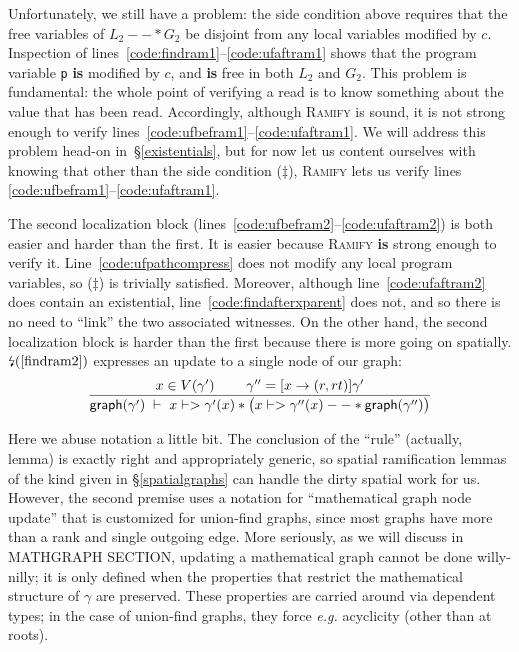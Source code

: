 Unfortunately, we still have a problem: the side condition above requires that 
the free variables of $L_2 --* G_2$ be disjoint from any local variables modified 
by $c$.  Inspection of lines~\ref{code:findram1}--\ref{code:ufaftram1} shows that the 
program variable \texttt{p} \textbf{is} modified by $c$, and \textbf{is} free in 
both $L_2$ and $G_2$.  This problem is fundamental: the whole point of verifying 
a read is to know something about the value that has been read.  Accordingly, 
although \textsc{Ramify} is sound, it is not strong enough to verify
lines~\ref{code:ufbefram1}--\ref{code:ufaftram1}.  We will address this problem 
head-on in~\S\ref{existentials}, but for now let us content ourselves with knowing 
that other than the side condition ($\ddagger$), \textsc{Ramify} lets us verify 
lines \ref{code:ufbefram1}--\ref{code:ufaftram1}.

The second localization block (lines~\ref{code:ufbefram2}--\ref{code:ufaftram2}) is both easier and harder than the first.  It is easier because \textsc{Ramify} \textbf{is} strong enough to verify it. Line~\ref{code:ufpathcompress} does not modify any local program variables, so ($\ddagger$) is trivially satisfied.  Moreover, although line~\ref{code:ufaftram2} does contain an existential, line~\ref{code:findafterxparent} does not, and so there is no need to ``link'' the two associated witnesses.  On the other hand, the second localization block is harder than the first because there is more going on spatially. $\mbox{\lightning}(\ref{findram2})$ expresses an update to a single node of our graph:
\begin{equation}
\label{findram2}
\frac
{x \in V(\gamma') \; \qquad \gamma'' = [x -> (r,rt)]\gamma'}
{\mathsf{graph}(\gamma') \; |- \; x |-> \gamma'(x) * \big(x |-> \gamma''(x) --* \mathsf{graph}(\gamma'')\big)}
\end{equation}

Here we abuse notation a little bit.  The conclusion of the ``rule'' (actually, lemma) is exactly right and appropriately generic, so spatial ramification lemmas of the kind given in \S\ref{spatialgraphs} can handle the dirty spatial work for us.  However, the second premise uses a notation for ``mathematical graph node update'' that is customized for union-find graphs, since most graphs have more than a rank and single outgoing edge.  More seriously, as we will discuss in MATHGRAPH SECTION, updating a mathematical graph cannot be done willy-nilly; it is only defined when the properties that restrict the mathematical structure of $\gamma$ are preserved. {\color{magenta}These properties are carried around via dependent types;} in the case of union-find graphs, they force \emph{e.g.} acyclicity (other than at roots).

